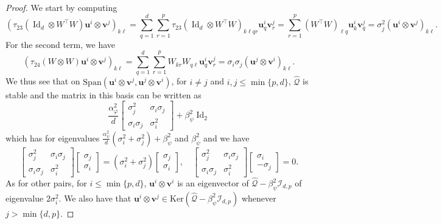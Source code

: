 \documentclass[letterpaper, 10pt, dvipsnames]{article}
\numberwithin{equation}{section}
\DeclareMathOperator{\Id}{Id}
\newcommand{\Q}{\mathcal{Q}}
\renewcommand{\u}{\mathbf{u}}
\renewcommand{\v}{\mathbf{v}}
\renewcommand{\phi}{\varphi}
\renewcommand{\hat}{\widehat}
\theoremstyle{definition}
\begin{document}
\begin{proof}
  We start by computing 
  \[
  \left(
    \tau_{23}\left(\Id_d\otimes W^\top W\right)\u^i\otimes \v^j
  \right)_{k\ell}
  =
  \sum_{q=1}^d\sum_{r=1}^p \tau_{23}(\Id_d\otimes W^\top W)_{k\ell qr}\u^i_{q}\v^j_r
  = 
  \sum_{r=1}^p (W^\top W)_{\ell q}\u^i_k \v^j_q
  =
  \sigma_j^2(\u^i\otimes \v^j)_{k\ell}.
  \]
  For the second term, we have 
  \[
  \left(
    \tau_{24}\left(W\otimes W\right)\u^i\otimes \v^j
  \right)_{k\ell}
  =
  \sum_{q=1}^d \sum_{r=1}^p
  W_{kr}W_{q\ell}\u^i_q \v^j_r
  =
  \sigma_i\sigma_j (\u^j\otimes \v^i)_{k\ell}.
  \]
  We thus see that on $\mathrm{Span}\left( \u^i\otimes \v^j,\u^j\otimes \v^i\right)$, for $i\neq j$ and $i,j \leq \min\{p,d\}$, $\hat{\Q}$ is stable and the matrix in this basis can be written as 
  \[
  \frac{\alpha_\phi^2}{d}\begin{bmatrix}
    \sigma_j^2 & \sigma_i\sigma_j \\
    \sigma_i\sigma_j & \sigma_i^2
  \end{bmatrix}  
  +
  \beta_\psi^2 \Id_2
  \]
  which has for eigenvalues $\frac{\alpha_\psi^2}{d}(\sigma_i^2+\sigma_j^2)+\beta_\psi^2$ and $\beta_\psi^2$ and we have 
  \[
  \begin{bmatrix}
    \sigma_j^2 & \sigma_i\sigma_j\\
    \sigma_i\sigma_j & \sigma_i^2
  \end{bmatrix}
  \begin{bmatrix}
    \sigma_j \\
    \sigma_i
  \end{bmatrix}
  =
  (\sigma_i^2+\sigma_j^2)\begin{bmatrix}
    \sigma_j\\
    \sigma_i
  \end{bmatrix},
  \quad 
  \begin{bmatrix}
    \sigma_j^2 & \sigma_i\sigma_j\\
    \sigma_i\sigma_j & \sigma_i^2
  \end{bmatrix} 
  \begin{bmatrix}
    \sigma_i \\
    -\sigma_j
  \end{bmatrix}
  =
  0.
  \]
  As for other pairs, for $i \leq \min\{p,d\}$,
  $\u^i\otimes \v^i$ is an eigenvector of $\hat{\Q}-\beta_\psi^2 \mathcal{I}_{d,p}$ of eigenvalue $2\sigma_i^2$.  We also have that $\u^i\otimes \v^j \in  \mathrm{Ker} \left(
    \hat{\Q}-\beta_\psi^2 \mathcal{I}_{d,p}
  \right)$ whenever $j > \min\{d,p\}$.
  
\end{proof} 
\end{document}
